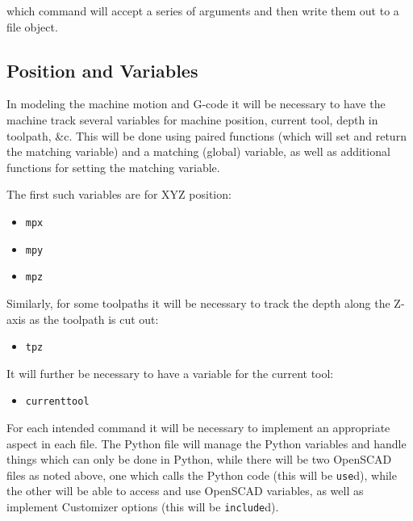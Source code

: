 \documentclass{ltxdoc}
\begin{document}
\noindent which command will accept a series of arguments and then write them out to a file 
object.

\subsection{Position and Variables}
 
In modeling the machine motion and G-code it will be necessary to have the machine track 
several variables for machine position, current tool, depth in toolpath, \&c. 
This will be done using paired functions (which will set and return the  
matching variable) and a matching (global) variable, as well as additional functions for 
setting the matching variable.

\begin{samepage}
The first such variables are for XYZ position:

\begin{itemize}
 \item \texttt{mpx} 
 \item \texttt{mpy} 
 \item \texttt{mpz} 
\end{itemize}
\end{samepage}

\begin{samepage}
Similarly, for some toolpaths it will be necessary to track the depth along the Z-axis
as the toolpath is cut out:
 
\begin{itemize}
 \item \texttt{tpz} 
\end{itemize}
\end{samepage}

\begin{samepage}
It will further be necessary to have a variable for the current tool:

\begin{itemize}
 \item \texttt{currenttool} 
\end{itemize}
\end{samepage}

For each intended command it will be necessary to implement an appropriate aspect in each file. 
The Python file will manage the Python variables and handle things which can only be done in 
Python, while there will be two OpenSCAD files as noted above, one which calls the Python code 
(this will be \texttt{use}d), while the other will be able to access
and use OpenSCAD variables, as well as implement Customizer options
(this will be \texttt{include}d).
\end{document}
